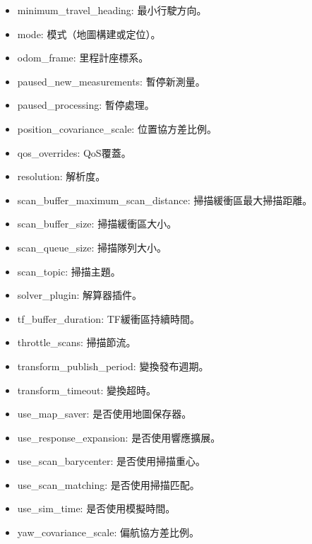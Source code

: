 \begin{itemize}
    \item minimum\_travel\_heading: 最小行駛方向。

    \item mode: 模式（地圖構建或定位）。

    \item odom\_frame: 里程計座標系。

    \item paused\_new\_measurements: 暫停新測量。

    \item paused\_processing: 暫停處理。

    \item position\_covariance\_scale: 位置協方差比例。

    \item qos\_overrides: QoS覆蓋。

    \item resolution: 解析度。

    \item scan\_buffer\_maximum\_scan\_distance: 掃描緩衝區最大掃描距離。

    \item scan\_buffer\_size: 掃描緩衝區大小。

    \item scan\_queue\_size: 掃描隊列大小。

    \item scan\_topic: 掃描主題。

    \item solver\_plugin: 解算器插件。

    \item tf\_buffer\_duration: TF緩衝區持續時間。

    \item throttle\_scans: 掃描節流。

    \item transform\_publish\_period: 變換發布週期。

    \item transform\_timeout: 變換超時。

    \item use\_map\_saver: 是否使用地圖保存器。

    \item use\_response\_expansion: 是否使用響應擴展。

    \item use\_scan\_barycenter: 是否使用掃描重心。

    \item use\_scan\_matching: 是否使用掃描匹配。

    \item use\_sim\_time: 是否使用模擬時間。

    \item yaw\_covariance\_scale: 偏航協方差比例。
\end{itemize}
